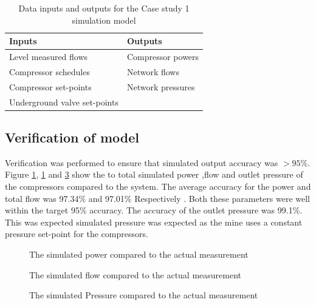 \begin{table}[h]
	\centering
	\begin{tabular}{ll}
		\hline
		Inputs \hspace*{4cm}    &Outputs \hspace*{4cm}    \\  \hline
		Level measured flows&Compressor powers \\
		Compressor schedules& Network flows \\
		Compressor set-points& Network pressures \\
		Underground valve set-points&  \\
		\hline
	\end{tabular}
	\caption{Data inputs and outputs for the Case study 1 simulation model }
	\label{table: Mine A inputs/outputs}
\end{table}


\subsection{Verification of model}
Verification was performed to ensure that simulated output accuracy was $>95$\%. Figure \ref{fig: Verification power Beatrix}, \ref{fig: Verification power Beatrix} and \ref{fig: Verification Pressure Beatrix} show the to total simulated power ,flow and outlet pressure of the compressors compared to the system. The average accuracy for the power and total flow was 97.34\%  and  97.01\% Respectively . Both these parameters were well within the target 95\% accuracy. The accuracy of the outlet pressure was 99.1\%. This was expected simulated pressure was expected as the mine uses a constant pressure set-point for the compressors.
\begin{figure}[h!]
	\centering
	
	\caption{The simulated power compared to the actual measurement}
	\label{fig: Verification power Beatrix}
\end{figure}
\begin{figure}[h!]
	\centering
	
	\caption{The simulated flow compared to the actual measurement}
	\label{fig: Verification flow Beatrix}
\end{figure}
\begin{figure}[h!]
	\centering
	
	\caption{The simulated Pressure compared to the actual measurement}
	\label{fig: Verification Pressure Beatrix}
\end{figure}


